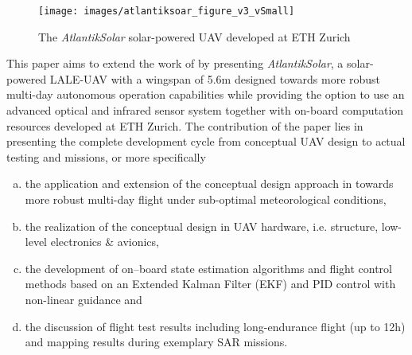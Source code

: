 \begin{figure}[b]
    \centering
    \texttt{[image: images/atlantiksoar\_figure\_v3\_vSmall]}
    \caption{The \textit{AtlantikSolar} solar-powered UAV developed at ETH Zurich}
    \label{fig:AtlantikSolarCollage}
\end{figure}


This paper aims to extend the work of \cite{Cocconi_SoLong,Noth_PhD} by presenting \textit{AtlantikSolar}, a solar-powered LALE-UAV with a wingspan of 5.6m designed towards more robust multi-day autonomous operation capabilities while providing the option to use an advanced optical and infrared sensor system together with on-board computation resources developed at ETH Zurich. The contribution of the paper lies in presenting the complete development cycle from conceptual UAV design to actual testing and missions, or more specifically
  
 \begin{enumerate}[(a)]
\item the application and extension of the conceptual design approach in \cite{Noth_PhD,Leutenegger_JIRS} towards more robust multi-day flight under sub-optimal meteorological conditions, 
\item the realization of the conceptual design in UAV hardware, i.e. structure, low-level electronics \& avionics, 
\item the development of on--board state estimation algorithms and flight control methods based on an Extended Kalman Filter (EKF) and PID control with non-linear guidance and
\item the discussion of flight test results including long-endurance flight (up to 12h) and mapping results during exemplary SAR missions.
\end{enumerate}

